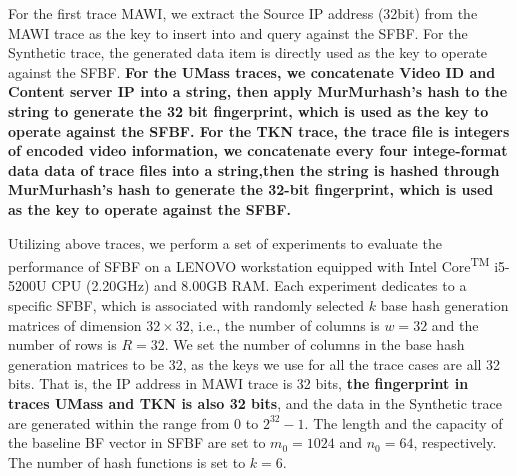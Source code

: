 \documentclass[10pt,journal,compsoc]{IEEEtran}
\newcommand{\note}[1]{{\sffamily\itshape\bfseries\uline{#1}}}
\begin{document}
For the first trace MAWI, we extract the Source IP address (32bit) from the MAWI trace  as the key  to insert into and query against the SFBF. For the Synthetic trace, the generated data item is directly used as the key to operate against the SFBF.
\textbf{For the UMass traces, we concatenate Video ID and Content server IP into a string, then apply MurMurhash's hash to the string to generate the 32 bit  fingerprint, which is used as the key to operate against the SFBF.
For the TKN trace, the trace file is integers of encoded video information, we concatenate every four intege-format data data of trace files into a string,then the string is hashed through MurMurhash's hash to generate the 32-bit fingerprint, which is used as the key to operate against the SFBF.}

Utilizing above traces, we perform a set of experiments to evaluate the performance of SFBF on a LENOVO workstation  equipped with Intel\textregistered {} Core\textsuperscript{TM} i5-5200U CPU (2.20GHz) and 8.00GB RAM. Each experiment dedicates to a specific SFBF, which is associated with randomly selected $k$ base hash generation matrices of dimension $32 \times 32$, i.e., the number of columns is $w=32$ and the number of rows is $R=32$. We set the number of columns in the base hash generation matrices to be 32, as the keys we use for all the trace cases are all 32 bits. That is, the IP address in MAWI trace is 32 bits, \textbf{the fingerprint in traces UMass and TKN is also 32 bits}, and the data in the Synthetic trace are generated within the range from 0 to $2^{32}-1$. The length and the capacity of the  baseline BF vector in SFBF are
set to $m_0 = 1024$ and $n_0 = 64$, respectively. The number of hash functions is set to $k = 6$.
\end{document}

